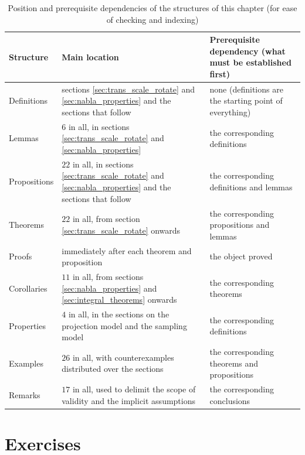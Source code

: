 \begin{table}[htbp]
    \centering
    \caption{Position and prerequisite dependencies of the structures of this chapter (for ease of checking and indexing)}
    \label{tab:chapter_structure_map}
    \renewcommand{\arraystretch}{1.2}
    \footnotesize
    \setlength{\tabcolsep}{4pt}
    \begin{tabular}{@{}l >{\raggedright\arraybackslash}p{3.1cm} >{\raggedright\arraybackslash}p{10.3cm}@{}}
        \toprule
        \textbf{Structure} & \textbf{Main location} & \textbf{Prerequisite dependency (what must be established first)} \\
        \midrule
        Definitions & sections \ref{sec:trans_scale_rotate} and \ref{sec:nabla_properties} and the sections that follow & none (definitions are the starting point of everything)\\
        Lemmas & $6$ in all, in sections \ref{sec:trans_scale_rotate} and \ref{sec:nabla_properties} & the corresponding definitions\\
        Propositions & $22$ in all, in sections \ref{sec:trans_scale_rotate} and \ref{sec:nabla_properties} and the sections that follow & the corresponding definitions and lemmas\\
        Theorems & $22$ in all, from section \ref{sec:trans_scale_rotate} onwards & the corresponding propositions and lemmas\\
        Proofs & immediately after each theorem and proposition & the object proved\\
        Corollaries & $11$ in all, from sections \ref{sec:nabla_properties} and \ref{sec:integral_theorems} onwards & the corresponding theorems\\
        Properties & $4$ in all, in the sections on the projection model and the sampling model & the corresponding definitions\\
        Examples & $26$ in all, with counterexamples distributed over the sections & the corresponding theorems and propositions\\
        Remarks & $17$ in all, used to delimit the scope of validity and the implicit assumptions & the corresponding conclusions\\
        \bottomrule
    \end{tabular}
\end{table}

\section*{Exercises}

